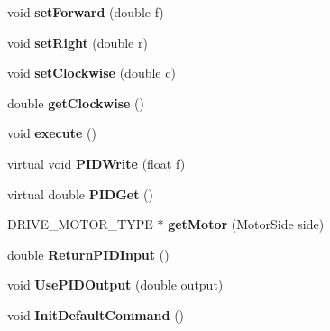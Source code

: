 \begin{DoxyCompactItemize}
\item 
\hypertarget{class_drive_bae_ab09e8a797848efa2a1f2eb6844941cb3}{}void {\bfseries set\+Forward} (double f)\label{class_drive_bae_ab09e8a797848efa2a1f2eb6844941cb3}

\item 
\hypertarget{class_drive_bae_a4fcdfa68a38e020a0497f6256989fe0b}{}void {\bfseries set\+Right} (double r)\label{class_drive_bae_a4fcdfa68a38e020a0497f6256989fe0b}

\item 
\hypertarget{class_drive_bae_a088352135fb6a558c93c0c9da74e37e2}{}void {\bfseries set\+Clockwise} (double c)\label{class_drive_bae_a088352135fb6a558c93c0c9da74e37e2}

\item 
\hypertarget{class_drive_bae_ac7fac12731fced5d6e9a7289fb9be485}{}double {\bfseries get\+Clockwise} ()\label{class_drive_bae_ac7fac12731fced5d6e9a7289fb9be485}

\item 
\hypertarget{class_drive_bae_aa64c38e02e64ee7795f4ae06bab26d48}{}void {\bfseries execute} ()\label{class_drive_bae_aa64c38e02e64ee7795f4ae06bab26d48}

\item 
\hypertarget{class_drive_bae_aec401bb78b3961da28c0fb36b2308ca4}{}virtual void {\bfseries P\+I\+D\+Write} (float f)\label{class_drive_bae_aec401bb78b3961da28c0fb36b2308ca4}

\item 
\hypertarget{class_drive_bae_ac4a719afe5c71f716c8753392ae0c6fd}{}virtual double {\bfseries P\+I\+D\+Get} ()\label{class_drive_bae_ac4a719afe5c71f716c8753392ae0c6fd}

\item 
\hypertarget{class_drive_bae_a06177effa3aedbcf3874701a93f36f9c}{}D\+R\+I\+V\+E\+\_\+\+M\+O\+T\+O\+R\+\_\+\+T\+Y\+P\+E $\ast$ {\bfseries get\+Motor} (Motor\+Side side)\label{class_drive_bae_a06177effa3aedbcf3874701a93f36f9c}

\item 
\hypertarget{class_drive_bae_ac2497d0afa36b5c72f2ee86f8fd892cf}{}double {\bfseries Return\+P\+I\+D\+Input} ()\label{class_drive_bae_ac2497d0afa36b5c72f2ee86f8fd892cf}

\item 
\hypertarget{class_drive_bae_a423ddc49659be37aed2c0509cc55289b}{}void {\bfseries Use\+P\+I\+D\+Output} (double output)\label{class_drive_bae_a423ddc49659be37aed2c0509cc55289b}

\item 
\hypertarget{class_drive_bae_a2adbbdb59bb0fdc9ed466a3d2edd92ff}{}void {\bfseries Init\+Default\+Command} ()\label{class_drive_bae_a2adbbdb59bb0fdc9ed466a3d2edd92ff}


\end{DoxyCompactItemize}
